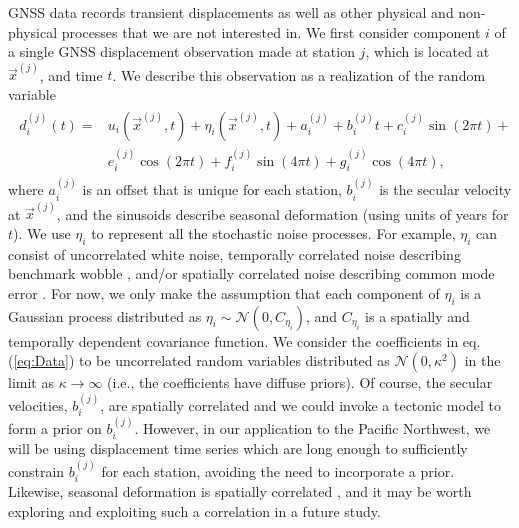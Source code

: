 \documentclass[extra,mreferee]{gji}
\begin{document}
GNSS data records transient displacements as well as other physical and non-physical processes that we are not interested in. We first consider component $i$ of a single GNSS displacement observation made at station $j$, which is located at $\vec{x}^{(j)}$, and time $t$. We describe this observation as a realization of the random variable 
\begin{align}\label{eq:Data}
\begin{split}
d^{(j)}_i(t) = &u_i(\vec{x}^{(j)},t) + \eta_i(\vec{x}^{(j)},t) + a_i^{(j)} + b_i^{(j)}t + c_i^{(j)}\sin(2 \pi t) + \\ 
               &e_i^{(j)}\cos(2 \pi t) + f_i^{(j)}\sin(4 \pi t)  + g_i^{(j)}\cos(4 \pi t), 
\end{split}
\end{align}
where $a_i^{(j)}$ is an offset that is unique for each station, $b_i^{(j)}$ is the secular velocity at $\vec{x}^{(j)}$, and the sinusoids describe seasonal deformation (using units of years for $t$). We use $\eta_i$ to represent all the stochastic noise processes. For example, $\eta_i$ can consist of uncorrelated white noise, temporally correlated noise describing benchmark wobble \citep[e.g.,][]{Wyatt1982,Wyatt1989}, and/or spatially correlated noise describing common mode error \citep[e.g.,][]{Wdowinski1997}. For now, we only make the assumption that each component of $\eta_i$ is a Gaussian process distributed as $\eta_i \sim \mathcal{N}(0,C_{\eta_i})$, and $C_{\eta_i}$ is a spatially and temporally dependent covariance function. We consider the coefficients in eq. (\ref{eq:Data}) to be uncorrelated random variables distributed as $\mathcal{N}(0,\kappa^2)$ in the limit as $\kappa \to \infty$ (i.e., the coefficients have diffuse priors). Of course, the secular velocities, $b_i^{(j)}$, are spatially correlated and we could invoke a tectonic model to form a prior on $b_i^{(j)}$. However, in our application to the Pacific Northwest, we will be using displacement time series which are long enough to sufficiently constrain $b_i^{(j)}$ for each station, avoiding the need to incorporate a prior. Likewise, seasonal deformation is spatially correlated \citep{Dong2002,Langbein2008}, and it may be worth exploring and exploiting such a correlation in a future study. 
\end{document}
